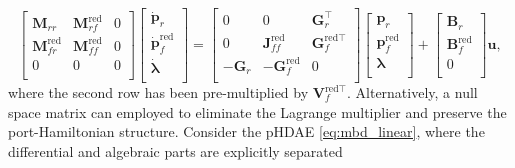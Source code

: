 \documentclass{svjour3}                     %
\begin{document}
	\begin{equation}
	\begin{bmatrix}
	\mathbf{M}_{rr} & \mathbf{M}_{rf}^{\text{red}} & 0 \\ 
	\mathbf{M}_{fr}^{\text{red}} & \mathbf{M}_{ff}^{\text{red}} & 0 \\
	0 & 0 & 0 \\
	\end{bmatrix}
	\begin{bmatrix}
	\dot{\mathbf{p}}_r \\ \dot{\mathbf{p}}_f^{\text{red}} \\ \dot{\bm{\lambda}} \\ 
	\end{bmatrix} = 
	\begin{bmatrix}
	0 & 0 & \mathbf{G}_r^\top \\ 
	0 & \mathbf{J}_{ff}^{\text{red}} & \mathbf{G}_f^{\text{red} \top} \\ 
	-\mathbf{G}_r & -\mathbf{G}_f^{\text{red}} & 0 \\
	\end{bmatrix}
	\begin{bmatrix}
	\mathbf{p}_r \\ \mathbf{p}_f^{\text{red}} \\ {\bm{\lambda}} \\ 
	\end{bmatrix} + 
	\begin{bmatrix}
	\mathbf{B}_r \\ \mathbf{B}_f^{\text{red}} \\ 0 \\
	\end{bmatrix}\mathbf{u},
	\end{equation}
	where the second row has been pre-multiplied by $\mathbf{V}_f^{\text{red} \top}$. Alternatively, a null space matrix can employed to eliminate the Lagrange multiplier and preserve the port-Hamiltonian structure. Consider the pHDAE \eqref{eq:mbd_linear}, where the differential and algebraic parts are explicitly separated
	
\end{document}

